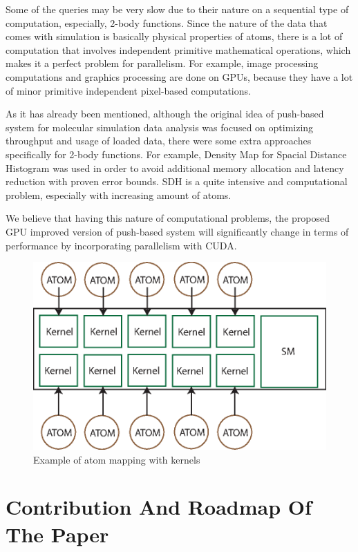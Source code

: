 \documentclass[12pt,letterpaper]{report}
\begin{document}
\noindent\hspace{3em}Some of the queries may be very slow due to their nature on a sequential type of computation,  especially, 2-body functions. Since the nature of the data that comes with simulation is basically physical properties of atoms, there is a lot of computation that involves independent primitive mathematical operations, which makes it a perfect problem for parallelism. For example, image processing computations and graphics processing are done on GPUs, because they have a lot of minor primitive independent pixel-based computations.

\noindent\hspace{3em}As it has already been mentioned, although the original idea of push-based system for molecular simulation data analysis was focused on optimizing throughput and usage of loaded data, there were some extra approaches specifically for 2-body functions. For example, Density Map for Spacial Distance Histogram was used in order to avoid additional memory allocation and latency reduction with proven error bounds. SDH is a quite intensive and computational problem, especially with increasing amount of atoms. 

\noindent\hspace{3em}We believe that having this nature of computational problems, the proposed GPU improved version of push-based system will significantly change in terms of performance by incorporating parallelism with CUDA.

\begin{figure}
\centering
\centerline{\includegraphics[width=0.5\columnwidth]{images/kernelatom.eps}}
\caption{ Example of atom mapping with kernels}
 \label{fg:kernelatom}


\end{figure}

\section{Contribution And Roadmap Of The Paper} 
\end{document}
